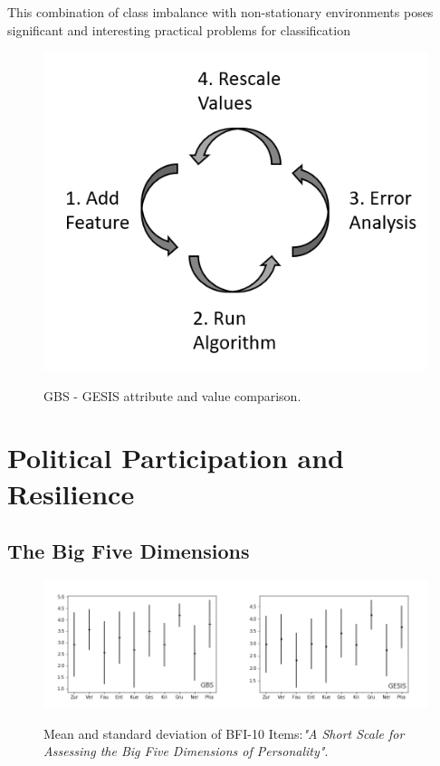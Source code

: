 This combination of class imbalance with non-stationary environments poses signiﬁcant and interesting practical problems for classiﬁcation


\begin{figure}[ht]
	\begin{center}
		\includegraphics[scale=0.50,angle=0]{fig/workflow_data_processing}
		\label{std}
		\caption{GBS - GESIS attribute and value comparison.}
	\end{center}
\end{figure}


\section{Political Participation and Resilience}

\subsection{The Big Five Dimensions}

\begin{figure}[ht]
	\begin{center}
		\includegraphics[scale=0.55,angle=0]{fig/std_figure}
		\label{std}
		\caption{Mean and standard deviation of BFI-10 Items:\textit{"A Short Scale for Assessing the Big Five Dimensions of Personality"}.}
	\end{center}
\end{figure}

